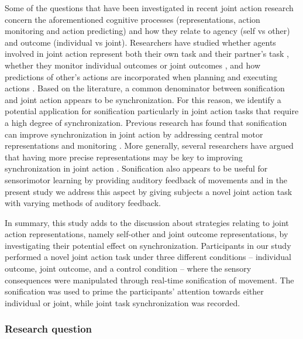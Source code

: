\documentclass[10pt,a4paper,onecolumn]{article}
\begin{document}
Some of the questions that have been investigated in recent joint action research concern the aforementioned cognitive processes (representations, action monitoring and action predicting) and how they relate to agency (self vs other) and outcome (individual vs joint). Researchers have studied whether agents involved in joint action represent both their own task and their partner's task \autocite{loehrSoundYouMe2016}, whether they monitor individual outcomes or joint outcomes \autocite{loehrMonitoringIndividualJoint2013}, and how predictions of other's actions are incorporated when planning and executing actions \autocite{knoblichActionCoordinationGroups2003,kourtisPredictiveRepresentationOther2012,loehrTemporalCoordinationPerforming2011,vesperAreYouReady2013}. Based on the literature, a common denominator between sonification and joint action appears to be synchronization. For this reason, we identify a potential application for sonification particularly in joint action tasks that require a high degree of synchronization. Previous research has found that sonification can improve synchronization in joint action by addressing central motor representations \autocite{schmitzPerceptualEffectsAuditory2012} and monitoring \autocite{vesperMinimalArchitectureJoint2010}. More generally, several researchers have argued that having more precise representations may be key to improving synchronization in joint action \autocite{boltSensoryAttenuationAuditory2021,kellerPianistsDuetBetter2007,kourtisPredictiveRepresentationOther2012,sebanzJointActionBodies2006,wenkeWhatSharedJoint2011}. Sonification also appears to be useful for sensorimotor learning by providing auditory feedback of movements \autocite{bevilacquaSensoriMotorLearningMovement2016} and in the present study we address this aspect by giving subjects a novel joint action task with varying methods of auditory feedback.

In summary, this study adds to the discussion about strategies relating to joint action representations, namely self-other and joint outcome representations, by investigating their potential effect on synchronization. Participants in our study performed a novel joint action task under three different conditions -- individual outcome, joint outcome, and a control condition -- where the sensory consequences were manipulated through real-time sonification of movement. The sonification was used to prime the participants' attention towards either individual or joint, while joint task synchronization was recorded.

\hypertarget{research-question}{%
\subsubsection{Research question}\label{research-question}}
\end{document}
